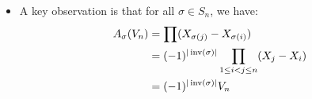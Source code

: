 \begin{itemize}
\begin{enumerate}
            \item For all $\sigma,\tau \in S_n$, we have:
            \begin{equation}
                A_{\sigma\tau} = A_\sigma \circ A_\tau
            \end{equation}
            \begin{proof}
                Let $P = \sum_{i_1,\dots,i_n} a_{i_1,\dots,i_n} X_1^{i_1}\cdots X_n^{i_n}$ be an arbitrary element of $\mathbb{C}[x_1,\dots,x_n]$. Then:
                \begin{align}
                    A_\sigma(A_\tau(P)) &= A_\sigma \left(\sum_{i_1,\dots, i_n \ge 0} a_{i_1,\dots,i_n} X_{\tau(1)}^{i_1}\cdots X_{\tau(n)}^{i_n}\right) \\ 
                    &= \sum_{i_1,\dots,i_n}\ge 0 a_{i_1,\dots, i_n \ge 0}a_{i_1,\dots,i_n} A_\sigma(X_\tau(1)^{i_1}) \cdots A_\sigma(X_{\tau(n)}^{i_n}) \\ 
                    &= A_{\sigma\tau}(P)
                \end{align}
            \end{proof}
    \end{enumerate}
    \begin{definition}
        The Vandermonde polynomial in $\mathbb{C}[X_1,\dots,X_n]$ is the polynomial $V_n = \prod_{1\le i < j \le n} (X_j - X_i)$.
    \end{definition}
    \item A key observation is that for all $\sigma \in S_n$, we have:
    \begin{align}
        A_\sigma(V_n) &= \prod (X_{\sigma(j)} - X_{\sigma(i)}) \\ 
        &= (-1)^{|\operatorname{inv}(\sigma)|} \prod_{1\le i < j \le n} (X_j-X_i) \\ 
        &= (-1)^{|\operatorname{inv}(\sigma)|} V_n
    \end{align}
\end{itemize}